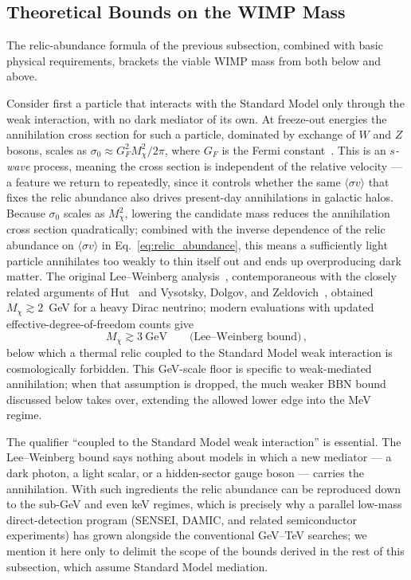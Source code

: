 \subsection{Theoretical Bounds on the WIMP Mass}
\label{sec:1.2.3}

The relic-abundance formula of the previous subsection, combined with basic physical requirements, brackets the viable WIMP mass from both below and above.

Consider first a particle that interacts with the Standard Model only through the weak interaction, with no dark mediator of its own.
At freeze-out energies the annihilation cross section for such a particle, dominated by exchange of $W$ and $Z$ bosons, scales as $\sigma_0 \approx G_F^2 M_\chi^2 / 2\pi$, where $G_F$ is the Fermi constant~\cite{Bertone:2004pz}.
This is an \emph{$s$-wave} process, meaning the cross section is independent of the relative velocity --- a feature we return to repeatedly, since it controls whether the same $\langle \sigma v \rangle$ that fixes the relic abundance also drives present-day annihilations in galactic halos.
Because $\sigma_0$ scales as $M_\chi^2$, lowering the candidate mass reduces the annihilation cross section quadratically; combined with the inverse dependence of the relic abundance on $\langle\sigma v\rangle$ in Eq.~\eqref{eq:relic_abundance}, this means a sufficiently light particle annihilates too weakly to thin itself out and ends up overproducing dark matter.
The original Lee--Weinberg analysis~\cite{Lee:1977ua}, contemporaneous with the closely related arguments of Hut~\cite{Hut:1977zn} and Vysotsky, Dolgov, and Zeldovich~\cite{Vysotsky:1977pe}, obtained $M_\chi \gtrsim 2$~GeV for a heavy Dirac neutrino; modern evaluations with updated effective-degree-of-freedom counts give~\cite{Cirelli:2024ssz,Bertone:2004pz}
\begin{equation}
	M_\chi \gtrsim 3~\mathrm{GeV} \qquad \text{(Lee--Weinberg bound)}\,,
	\label{eq:lee_weinberg}
\end{equation}
below which a thermal relic coupled to the Standard Model weak interaction is cosmologically forbidden.
This GeV-scale floor is specific to weak-mediated annihilation; when that assumption is dropped, the much weaker BBN bound discussed below takes over, extending the allowed lower edge into the MeV regime.

The qualifier ``coupled to the Standard Model weak interaction'' is essential.
The Lee--Weinberg bound says nothing about models in which a new mediator --- a dark photon, a light scalar, or a hidden-sector gauge boson --- carries the annihilation.
With such ingredients the relic abundance can be reproduced down to the sub-GeV and even keV regimes, which is precisely why a parallel low-mass direct-detection program (SENSEI, DAMIC, and related semiconductor experiments) has grown alongside the conventional GeV--TeV searches; we mention it here only to delimit the scope of the bounds derived in the rest of this subsection, which assume Standard Model mediation.

